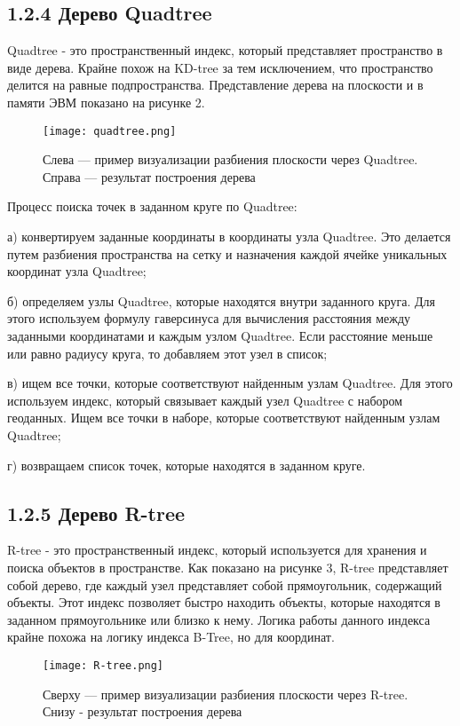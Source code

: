\subsection{1.2.4 Дерево Quadtree}
Quadtree - это пространственный индекс, который представляет пространство в виде дерева. Крайне похож на KD-tree за тем исключением, что пространство делится на равные подпространства. Представление дерева на плоскости и в памяти ЭВМ показано на рисунке 2. 
\par\vspace{1em}
\begin{figure}[H]
    \centering
    \texttt{[image: quadtree.png]}
    \caption{Слева --- пример визуализации разбиения плоскости через Quadtree. Справа — результат построения дерева}
\end{figure}
  
Процесс поиска точек в заданном круге по Quadtree:
\par а) конвертируем заданные координаты в координаты узла Quadtree. Это делается путем разбиения пространства на сетку и назначения каждой ячейке уникальных координат узла Quadtree;
\par б) определяем узлы Quadtree, которые находятся внутри заданного круга. Для этого используем формулу гаверсинуса для вычисления расстояния между заданными координатами и каждым узлом Quadtree. Если расстояние меньше или равно радиусу круга, то добавляем этот узел в список;
\par в) ищем все точки, которые соответствуют найденным узлам Quadtree. Для этого используем индекс, который связывает каждый узел Quadtree с набором геоданных. Ищем все точки в наборе, которые соответствуют найденным узлам Quadtree;
\par г) возвращаем список точек, которые находятся в заданном круге.


\subsection{1.2.5 Дерево R-tree}
R-tree - это пространственный индекс, который используется для хранения и поиска объектов в пространстве\cite{guttmanRtree}. Как показано на рисунке 3, R-tree представляет собой дерево, где каждый узел представляет собой прямоугольник, содержащий объекты. Этот индекс позволяет быстро находить объекты, которые находятся в заданном прямоугольнике или близко к нему. Логика работы данного индекса крайне похожа на логику индекса B-Tree, но для координат.
\par\vspace{1em}
\begin{figure}[H]
    \centering
    \texttt{[image: R-tree.png]}
    \caption{Сверху — пример визуализации разбиения плоскости через R-tree. Снизу - результат построения дерева}
\end{figure}
  
